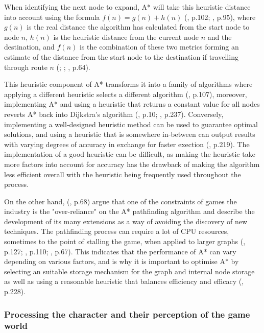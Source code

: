\documentclass[11pt, a4paper]{article}
\begin{document}
When identifying the next node to expand, A* will take this heuristic distance into account using the formula $f(n) = g(n) + h(n)$ (\cite{hart1968formal}, p.102; \cite{russell2016artificial}, p.95), where $g(n)$ is the real distance the algorithm has calculated from the start node to node $n$, $h(n)$ is the heuristic distance from the current node $n$ and the destination, and $f(n)$ is the combination of these two metrics forming an estimate of the distance from the start node to the destination if travelling through route $n$ (\cite{hart1968formal}; \cite{millington2019ai}; \cite{graham2003pathfinding}, p.64). 

This heuristic component of A* transforms it into a family of algorithms where applying a different heuristic selects a different algorithm (\cite{hart1968formal}, p.107), moreover, implementing A* and using a heuristic that returns a constant value for all nodes reverts A* back into Dijkstra's algorithm (\cite{lester2005pathfinding}, p.10; \cite{millington2019ai}, p.237). Conversely, implementing a well-designed heuristic method can be used to guarantee optimal solutions, and using a heuristic that is somewhere in-between can output results with varying degrees of accuracy in exchange for faster exection (\cite{millington2019ai}, p.219).  The implementation of a good heuristic can be difficult, as making the heuristic take more factors into account for accuracy has the drawback of making the algorithm less efficient overall with the heuristic being frequently used throughout the process.

On the other hand, \citeauthor{graham2003pathfinding} (\citeyear{graham2003pathfinding}, p.68) argue that one of the constraints of games the industry is the "over-reliance" on the A* pathfinding algorithm and describe the development of its many extensions as a way of avoiding the discovery of new techniques. The pathfinding process can require a lot of CPU resources, sometimes to the point of stalling the game, when applied to larger graphs (\cite{cui2011based}, p.127; \cite{stentz1996map}, p.110; \cite{graham2003pathfinding}, p.67). This indicates that the performance of A* can vary depending on various factors, and is why it is important to optimise A* by selecting an suitable storage mechanism for the graph and internal node storage as well as using a reasonable heuristic that balances efficiency and efficacy (\cite{millington2019ai}, p.228).

\subsubsection{Processing the character and their perception of the game world}
\end{document}
